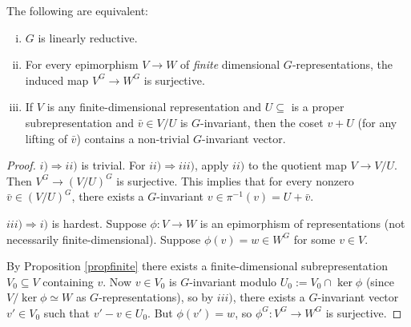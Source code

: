 \documentclass[11pt, english]{article}
\begin{document}
\begin{prop}
\label{proplinred}
The following are equivalent:
\begin{enumerate}[i)]
\item $G$ is linearly reductive.
\item For every epimorphism $V \to W$  of \emph{finite} dimensional $G$-representations, the induced map $V^G \to W^G$ is surjective.
\item If $V$ is any finite-dimensional representation and $U \subseteq$ is a proper subrepresentation and $\bar v \in V/U$ is $G$-invariant, then the coset $v + U$ (for any lifting of $\bar v$) contains a non-trivial $G$-invariant vector.
\end{enumerate}
\end{prop}
\begin{proof}
$i) \Rightarrow ii)$ is trivial. For $ii) \Rightarrow iii)$, apply $ii)$ to the quotient map $V \to V/U$. Then $V^G \to (V/U)^G$ is surjective. This implies that for every nonzero $\bar v \in (V/U)^G$, there exists a $G$-invariant $v \in \pi^{-1}(v)=U+\bar v$.

$iii) \Rightarrow i)$ is hardest. Suppose $\phi:V \to W$ is an epimorphism of representations (not necessarily finite-dimensional). Suppose $\phi(v)=w \in W^G$ for some $v \in V$. 

By Proposition \ref{propfinite} there exists a finite-dimensional subrepresentation $V_0 \subseteq V$ containing $v$. Now $v \in V_0$ is $G$-invariant modulo $U_0 := V_0 \cap \ker \phi$ (since $V/\ker \phi \simeq W$ as $G$-representations), so by $iii)$, there exists a $G$-invariant vector $v' \in V_0$ such that $v'-v \in U_0$. But $\phi(v')=w$, so $\phi^G:V^G \to W^G$ is surjective.
\end{proof}
\end{document}
